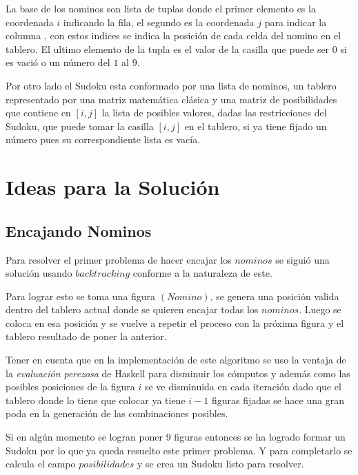 \documentclass[a4paper,10pt,twocolumn]{article}
\begin{document}

La base de los nominos son lista de tuplas donde el primer elemento es la coordenada $i$ indicando la fila, el segundo es la coordenada $j $ para indicar la columna , con estos indices se indica la posición de cada celda del nomino en el tablero. El ultimo elemento de la tupla es el valor de la casilla que puede ser $0$ si es vació o  un número del $1 $  al $9$. 

Por otro lado el Sudoku esta conformado por una lista de nominos, un tablero representado por una matriz matemática clásica y una matriz de posibilidades que contiene en $[i,j]$ la lista de posibles valores, dadas las restricciones del Sudoku, que puede tomar la casilla $[i,j]$ en el tablero, si ya tiene fijado un número pues su correspondiente lista es vacía. 	   


	



\section{Ideas para la Solución}\label{sec:conc}


\subsection{Encajando Nominos}

Para resolver el primer problema de hacer encajar los $nominos$ se siguió una solución usando $backtracking$ conforme a la naturaleza de este.

Para lograr esto se toma una figura $(Nomino)$, se genera una posición valida dentro del tablero actual donde se quieren encajar todas los $nominos$. Luego se coloca en esa posición y se vuelve a repetir el proceso con la próxima figura y el tablero resultado de poner la anterior. 

Tener en cuenta que en la implementación de este algoritmo se uso la ventaja de la \emph {evaluación perezosa} de Haskell para disminuir los cómputos y además como las posibles posiciones de la figura $ i $ se ve disminuida en cada iteración dado que el tablero donde lo tiene que colocar ya tiene $i -1$ figuras fijadas se hace una gran poda en la generación de las combinaciones posibles.

Si en algún momento se logran poner 9 figuras entonces se ha logrado formar un Sudoku por lo que ya queda resuelto este primer problema. Y para completarlo se calcula el campo $ posibilidades $ y se crea un Sudoku listo para resolver.
\end{document}

